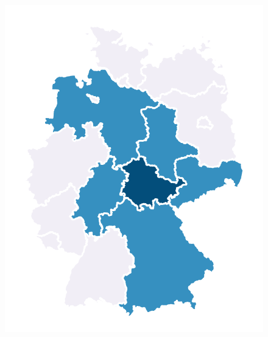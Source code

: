 \begin{figure} %
    \centering %
    \begin{minipage}[b]{.3\linewidth} %
        \includegraphics[width=\linewidth,trim={1cm 1cm 1cm 1cm},clip]{body/figures/71-BL_nb_e.pdf} %
    \end{minipage} %
    \hfill
    \begin{minipage}[b]{.3\linewidth}

\end{minipage}
\end{figure}
